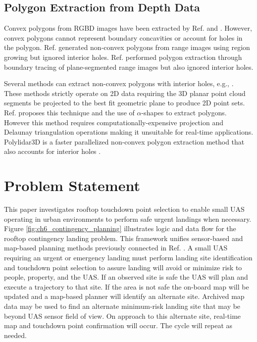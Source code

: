 \subsection{Polygon Extraction from Depth Data}

Convex polygons from RGBD images have been extracted by Ref. \cite{biswas_planar_2012} and \cite{poppinga_fast_2008}.  However, convex polygons cannot represent boundary concavities or account for holes in the polygon. Ref. \cite{lee_indoor_2012-1} generated non-convex polygons from range images using region growing but ignored interior holes. Ref. \cite{trevor2013efficient} performed polygon extraction through boundary tracing of plane-segmented range images but also ignored interior holes.

Several methods can extract non-convex polygons with interior holes, e.g., \cite{edelsbrunner_shape_1983, furieri_spatialite_2017}. These methods strictly operate on 2D data requiring the 3D planar point cloud segments be projected to the best fit geometric plane to produce 2D point sets. Ref. \cite{lee_fast_2013} proposes this technique and the use of $\alpha$-shapes to extract polygons. However this method requires computationally-expensive projection and Delaunay triangulation operations making it unsuitable for real-time applications. Polylidar3D is a faster parallelized non-convex polygon extraction method that also accounts for interior holes \cite{castagno_polylidar3d_2020}.


\section{Problem Statement}\label{sec:ch6_problem_statement}

This paper investigates rooftop touchdown point selection to enable small UAS operating in urban environments to perform safe urgent landings when necessary. Figure \ref{fig:ch6_contingency_planning} illustrates logic and data flow for the rooftop contingency landing problem. This framework unifies sensor-based and map-based planning methods previously connected  in Ref. \cite{ten_harmsel_emergency_2017}.  A small UAS requiring an urgent or emergency landing must perform landing site identification and touchdown point selection to assure landing will avoid or minimize risk to people, property, and the UAS. If an observed site is safe the UAS will plan and execute a trajectory to that site. If the area is not safe the on-board map will be updated and a map-based planner will identify an alternate site. Archived map data may be used to find an alternate minimum-risk landing site that may be beyond UAS sensor field of view. On approach to this alternate site, real-time map and touchdown point confirmation will occur. The cycle will repeat as needed. 

